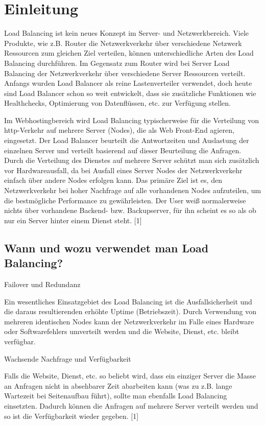 
\section{Einleitung}
\label{sec:Einleitung}
Load Balancing ist kein neues Konzept im Server- und Netzwerkbereich. Viele Produkte, wie z.B. Router die Netzwerkverkehr über verschiedene Netzwerk Ressourcen zum gleichen Ziel verteilen, können unterschiedliche Arten des Load Balancing durchführen. Im Gegensatz zum Router wird bei Server Load Balancing der Netzwerkverkehr über verschiedene Server Ressourcen verteilt. Anfangs wurden Load Balancer als reine Lastenverteiler verwendet, doch heute sind Load Balancer schon so weit entwickelt, dass sie zusätzliche Funktionen wie Healthchecks, Optimierung von Datenflüssen, etc. zur Verfügung stellen.

Im Webhostingbereich wird Load Balancing typischerweise für die Verteilung von http-Verkehr auf mehrere Server (Nodes), die als Web Front-End agieren, eingesetzt. Der Load Balancer beurteilt die Antwortzeiten und Auslastung der einzelnen Server und verteilt basierend auf dieser Beurteilung die Anfragen. Durch die Verteilung des Dienstes auf mehrere Server schützt man sich zusätzlich vor Hardwareausfall, da bei Ausfall eines Server Nodes der Netzwerkverkehr einfach über andere Nodes erfolgen kann. Das primäre Ziel ist es, den Netzwerkverkehr bei hoher Nachfrage auf alle vorhandenen Nodes aufzuteilen, um die bestmögliche Performance zu gewährleisten. Der User weiß normalerweise nichts über vorhandene Backend- bzw. Backupserver, für ihn scheint es so als ob nur ein Server hinter einem Dienst steht. [1]

\subsection{Wann und wozu verwendet man Load Balancing?}
\label{sec:Wann und wozu verwendet man Load Balancing?}

\begin{list}{•}{}
\item Failover und Redundanz

	  Ein wesentliches Einsatzgebiet des Load Balancing ist die Ausfallsicherheit und die daraus resultierenden 		  erhöhte Uptime (Betriebszeit). Durch Verwendung von mehreren identischen Nodes kann der Netzwerkverkehr im 	  Falle eines Hardware oder Softwarefehlers umverteilt werden und die Website, Dienst, etc. bleibt 			 	  verfügbar. 
\item Wachsende Nachfrage und Verfügbarkeit
	  
	  Falls die Website, Dienst, etc. so beliebt wird, dass ein einziger Server die Masse an Anfragen nicht in 			  absehbarer Zeit abarbeiten kann (was zu z.B. lange Wartezeit bei Seitenaufbau führt), sollte man ebenfalls 	  Load Balancing einsetzten. Dadurch können die Anfragen auf mehrere Server verteilt werden und so ist die 			  Verfügbarkeit wieder gegeben. [1]     
\end{list}

